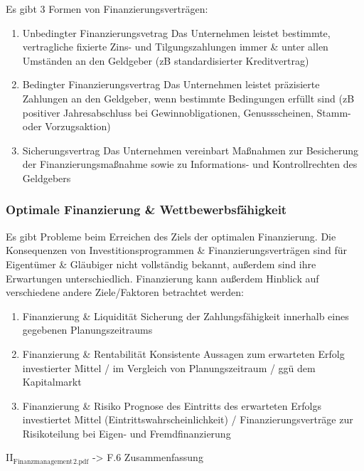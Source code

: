 \documentclass[11pt]{article}
\begin{document}
\begin{enumerate}
Es gibt 3 Formen von Finanzierungsverträgen:

\begin{enumerate}
\item Unbedingter Finanzierungsvetrag
Das Unternehmen leistet bestimmte, vertragliche fixierte Zins- und Tilgungszahlungen immer \& unter allen Umständen an den Geldgeber (zB standardisierter Kreditvertrag)

\item Bedingter Finanzierungsvertrag
Das Unternehmen leistet präzisierte Zahlungen an den Geldgeber, wenn bestimmte Bedingungen erfüllt sind (zB positiver Jahresabschluss bei Gewinnobligationen, Genussscheinen, Stamm- oder Vorzugsaktion)

\item Sicherungsvertrag
Das Unternehmen vereinbart Maßnahmen zur Besicherung der Finanzierungsmaßnahme sowie zu Informations- und Kontrollrechten des Geldgebers
\end{enumerate}
\end{enumerate}

\subsubsection{Optimale Finanzierung \& Wettbewerbsfähigkeit}
\label{sec:orgf4a526b}
Es gibt Probleme beim Erreichen des Ziels der optimalen Finanzierung. Die Konsequenzen von Investitionsprogrammen \& Finanzierungsverträgen sind für Eigentümer \& Gläubiger nicht vollständig bekannt, außerdem sind ihre Erwartungen unterschiedlich. Finanzierung kann außerdem Hinblick auf verschiedene andere Ziele/Faktoren betrachtet werden:

\begin{enumerate}
\item Finanzierung \& Liquidität
Sicherung der Zahlungsfähigkeit innerhalb eines gegebenen Planungszeitraums

\item Finanzierung \& Rentabilität
Konsistente Aussagen zum erwarteten Erfolg investierter Mittel / im Vergleich von Planungszeitraum / ggü dem Kapitalmarkt

\item Finanzierung \& Risiko
Prognose des Eintritts des erwarteten Erfolgs investiertet Mittel (Eintrittswahrscheinlichkeit) / Finanzierungsverträge zur Risikoteilung bei Eigen- und Fremdfinanzierung
\end{enumerate}

II\(_{\text{Finanzmanagement}}\)\(_{\text{2.pdf}}\) -> F.6 Zusammenfassung
\end{document}
